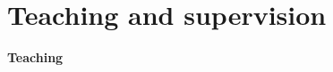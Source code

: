 \documentclass[12pt]{article} %
\begin{document}



\section{Teaching and supervision}

\textbf{\large Teaching} \medskip 

\end{document}
